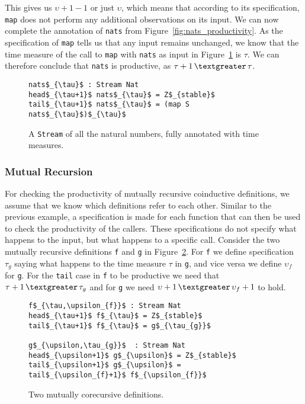This gives us $\upsilon+1-1$ or just $\upsilon$, which means that according to its specification, \texttt{map} does not perform any additional observations on its input. We can now complete the annotation of \texttt{nats} from Figure~\ref{fig:nats_productivity}. As the specification of \texttt{map} tells us that any input remains unchanged, we know that the time measure of the call to \texttt{map} with \texttt{nats} as input in Figure~\ref{fig:natsComplete} is $\tau$. We can therefore conclude that \texttt{nats} is productive, as $\tau+1\,\textgreater\,\tau$.

\begin{figure}
\begin{Verbatim}[commandchars=\\\{\},codes={\catcode`$=3\catcode`_=8}]
nats$_{\tau}$ : Stream Nat
head$_{\tau+1}$ nats$_{\tau}$ = Z$_{stable}$
tail$_{\tau+1}$ nats$_{\tau}$ = (map S nats$_{\tau}$)$_{\tau}$
\end{Verbatim}
\caption{A \texttt{Stream} of all the natural numbers, fully annotated with time measures.}
\label{fig:natsComplete}
\end{figure}

\subsubsection{Mutual Recursion}
For checking the productivity of mutually recursive coinductive definitions, we assume that we know which definitions refer to each other. Similar to the previous example, a specification is made for each function that can then be used to check the productivity of the callers. These specifications do not specify what happens to the input, but what happens to a specific call. Consider the two mutually recursive definitions \texttt{f} and \texttt{g} in Figure~\ref{fig:mutRec1}. For \texttt{f} we define specification $\tau_{g}$ saying what happens to the time measure $\tau$ in \texttt{g}, and vice versa we define $\upsilon_{f}$ for \texttt{g}. For the \texttt{tail} case in \texttt{f} to be productive we need that $\tau+1\,\textgreater\,\tau_{g}$ and for \texttt{g} we need $\upsilon+1\,\textgreater\,\upsilon_{f}+1$ to hold.

\begin{figure}
\begin{Verbatim}[commandchars=\\\{\},codes={\catcode`$=3\catcode`_=8}]
f$_{\tau,\upsilon_{f}}$ : Stream Nat
head$_{\tau+1}$ f$_{\tau}$ = Z$_{stable}$
tail$_{\tau+1}$ f$_{\tau}$ = g$_{\tau_{g}}$

g$_{\upsilon,\tau_{g}}$  : Stream Nat
head$_{\upsilon+1}$ g$_{\upsilon}$ = Z$_{stable}$
tail$_{\upsilon+1}$ g$_{\upsilon}$ = tail$_{\upsilon_{f}+1}$ f$_{\upsilon_{f}}$
\end{Verbatim}
\caption{Two mutually corecursive definitions.}
\label{fig:mutRec1}
\end{figure}

